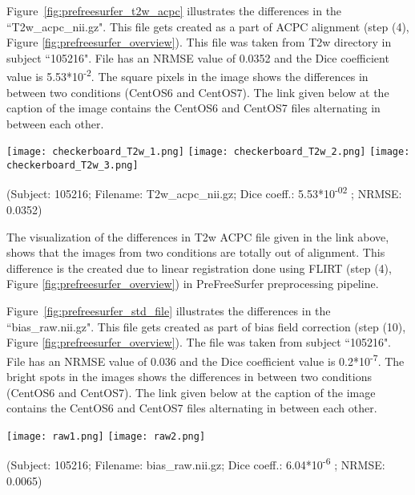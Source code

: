 Figure~\ref{fig:prefreesurfer_t2w_acpc} illustrates the differences in the ``T2w\_acpc\_nii.gz". This file gets created as a part of ACPC alignment (step (4), Figure \ref{fig:prefreesurfer_overview}). This file was taken from T2w directory in subject ``105216". File has an NRMSE value of 0.0352 and the Dice coefficient value is 5.53*10\textsuperscript{-2}. The square pixels in the image shows the differences in between two conditions (CentOS6 and CentOS7).
The link given below at the caption of the image contains the CentOS6 and CentOS7 files alternating in between each other.

\begin{center}
\texttt{[image: checkerboard\_T2w\_1.png]}%
\texttt{[image: checkerboard\_T2w\_2.png]}%
\texttt{[image: checkerboard\_T2w\_3.png]}
\caption*{(Subject: 105216; Filename: T2w\_acpc\_nii.gz; Dice coeff.: 5.53*10\textsuperscript{-02} ; NRMSE: 0.0352)}
\label{fig:prefreesurfer_t2w_acpc}
\end{center}

The visualization of the differences in T2w ACPC file given in the link above, shows that the images from two conditions are totally out of alignment. This difference is the created due to linear registration done using FLIRT (step (4), Figure \ref{fig:prefreesurfer_overview}) in PreFreeSurfer preprocessing pipeline.

Figure~\ref{fig:prefreesurfer_std_file} illustrates the differences in the ``bias\_raw.nii.gz".
This file gets created as part of bias field correction (step (10), Figure \ref{fig:prefreesurfer_overview}). The file was taken from subject ``105216". File has an NRMSE value of 0.036 and the Dice coefficient value is 0.2*10\textsuperscript{-7}. The bright spots in the images shows the differences in between two conditions (CentOS6 and CentOS7).
The link given below at the caption of the image contains the CentOS6 and CentOS7 files alternating in between each other.

\begin{center}
\texttt{[image: raw1.png]}%
\texttt{[image: raw2.png]}
\caption*{(Subject: 105216; Filename: bias\_raw.nii.gz; Dice coeff.: 6.04*10\textsuperscript{-6} ; NRMSE: 0.0065)}
\label{fig:prefreesurfer_std_file}
\end{center}

